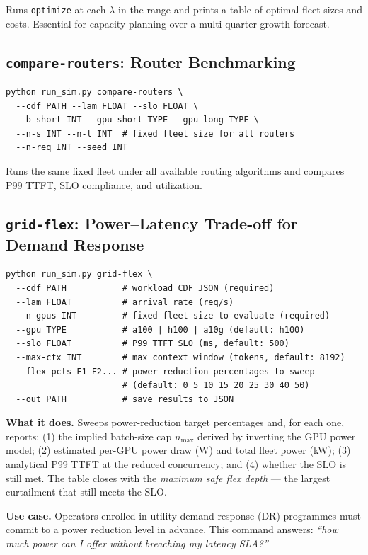 \documentclass[11pt,a4paper]{article}
\begin{document}
Runs \texttt{optimize} at each $\lambda$ in the range and prints a
table of optimal fleet sizes and costs.  Essential for capacity
planning over a multi-quarter growth forecast.

\subsection{\texttt{compare-routers}: Router Benchmarking}

\begin{lstlisting}[style=shell]
python run_sim.py compare-routers \
  --cdf PATH --lam FLOAT --slo FLOAT \
  --b-short INT --gpu-short TYPE --gpu-long TYPE \
  --n-s INT --n-l INT  # fixed fleet size for all routers
  --n-req INT --seed INT
\end{lstlisting}

Runs the same fixed fleet under all available routing algorithms
and compares P99 TTFT, SLO compliance, and utilization.

\subsection{\texttt{grid-flex}: Power–Latency Trade-off for Demand Response}
\label{sec:cli-grid-flex}

\begin{lstlisting}[style=shell]
python run_sim.py grid-flex \
  --cdf PATH           # workload CDF JSON (required)
  --lam FLOAT          # arrival rate (req/s)
  --n-gpus INT         # fixed fleet size to evaluate (required)
  --gpu TYPE           # a100 | h100 | a10g (default: h100)
  --slo FLOAT          # P99 TTFT SLO (ms, default: 500)
  --max-ctx INT        # max context window (tokens, default: 8192)
  --flex-pcts F1 F2... # power-reduction percentages to sweep
                       # (default: 0 5 10 15 20 25 30 40 50)
  --out PATH           # save results to JSON
\end{lstlisting}

\textbf{What it does.}
Sweeps power-reduction target percentages and, for each one, reports:
(1) the implied batch-size cap $n_{\max}$ derived by inverting the GPU power
model; (2) estimated per-GPU power draw (W) and total fleet power (kW);
(3) analytical P99 TTFT at the reduced concurrency; and (4) whether the
SLO is still met.  The table closes with the \emph{maximum safe flex depth}
--- the largest curtailment that still meets the SLO.

\textbf{Use case.}
Operators enrolled in utility demand-response (DR) programmes must commit
to a power reduction level in advance.  This command answers: \emph{``how
much power can I offer without breaching my latency SLA?''}
\end{document}
